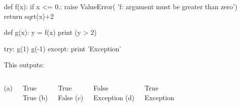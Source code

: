 \begin{frame}[fragile]

\begin{python}
def f(x):
    if x <= 0.:
        raise ValueError(
            'f: argument must be greater than zero')
    return sqrt(x)+2

def g(x):
    y = f(x)
    print (y > 2) 

try:
    g(1)
    g(-1)
except:
    print 'Exception'
\end{python}

This outputs:

\begin{columns}
(a)\par
True\\True
{}
(b)\par
True\\False
{}
(c)\par
False\\Exception
{}
(d)\par
True\\Exception
\end{columns}

\end{frame}



